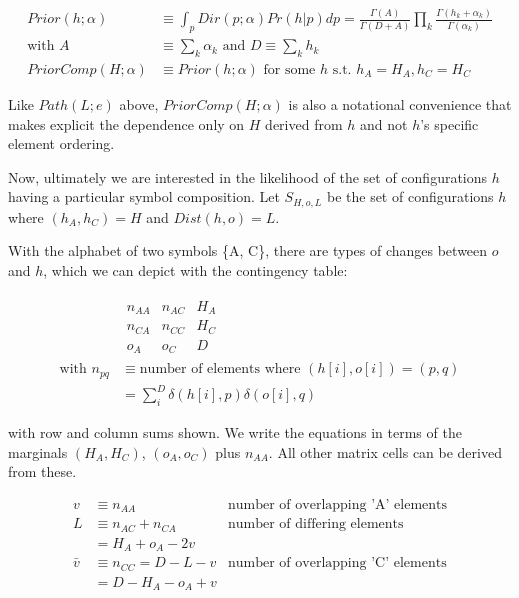\documentclass{article}
\begin{document}
\begin{align}
Prior(h;\alpha) & \equiv \int_p{Dir(p;\alpha) Pr(h|p)dp}
= \frac{\Gamma(A)}{\Gamma(D+A)}
\prod_k \frac{\Gamma(h_k+\alpha_k)}{\Gamma(\alpha_k)} \\[2ex]
\text{with } A & \equiv \sum_k \alpha_k \text{ and } D \equiv \sum_k h_k \nonumber \\[2ex]
PriorComp(H;\alpha) & \equiv Prior(h;\alpha) \text{ for some } h \text{ s.t. } h_A = H_A, h_C = H_C
\end{align}

Like $Path(L;e)$ above, $PriorComp(H;\alpha)$ is also a notational
convenience that makes explicit the dependence only on $H$ derived
from $h$ and not $h$'s specific element ordering.

Now, ultimately we are interested in the likelihood of the set of
configurations $h$ having a particular symbol composition. Let
$S_{H,o,L}$ be the set of configurations $h$ where $(h_A,h_C) = H$ and
$Dist(h, o) = L$.

With the alphabet of two symbols \{A, C\}, there are types of changes
between $o$ and $h$, which we can depict with the contingency table:

\begin{align*}
  & \begin{matrix}
    n_{AA} & n_{AC} & H_A \\
    n_{CA} & n_{CC} & H_C \\
    o_A & o_C & D
  \end{matrix} \\[2ex]
  \text{with }
  n_{pq} & \equiv \text{number of elements where } (h[i],o[i]) = (p,q) \\
  & = \sum_{i}^{D} \delta(h[i],p) \delta(o[i],q)
\end{align*}

with row and column sums shown.  We write the equations in terms of
the marginals $(H_A, H_C)$, $(o_A, o_C)$ plus $n_{AA}$. All other
matrix cells can be derived from these.

\begin{align*}
  v & \equiv n_{AA} & \text{number of overlapping 'A' elements} \\
  L & \equiv n_{AC} + n_{CA} & \text{number of differing elements} \nonumber \\
  & = H_A + o_A - 2v \\
  \bar{v} & \equiv n_{CC} = D - L - v & \text{number of overlapping 'C' elements} \\
  & = D - H_A - o_A + v
\end{align*}
\end{document}

